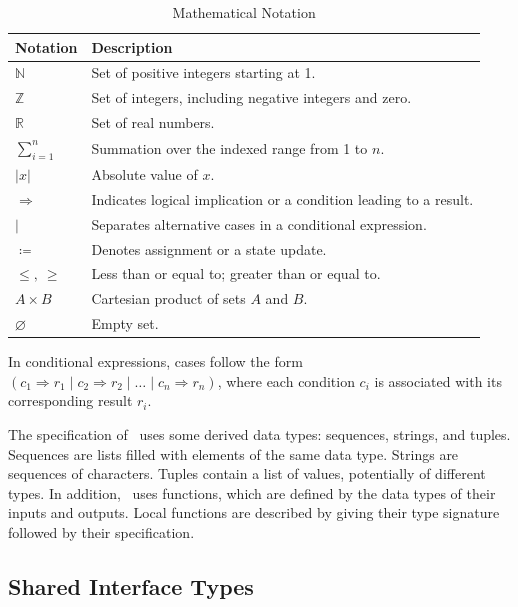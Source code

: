 \documentclass[12pt, titlepage]{article}
\begin{document}
\begin{table}[H]
    \centering
    \caption{Mathematical Notation}
    \label{tab:mathematical-notation}
    \begin{tabularx}{\textwidth}{
        @{}
        >{\centering\arraybackslash}p{}
        >{\raggedright\arraybackslash}X
        @{}
    }
        \toprule
        \textbf{Notation} & \textbf{Description} \\
        \midrule
        $\mathbb{N}$ & Set of positive integers starting at 1. \\
        $\mathbb{Z}$ & Set of integers, including negative integers and zero. \\
        $\mathbb{R}$ & Set of real numbers. \\
        $\sum_{i=1}^{n}$ & Summation over the indexed range from 1 to $n$. \\
        $|x|$ & Absolute value of $x$. \\
        $\Rightarrow$ & Indicates logical implication or a condition leading to a result. \\
        $\mid$ & Separates alternative cases in a conditional expression. \\
        $\coloneqq$ & Denotes assignment or a state update. \\
        $\leq,\ \geq$ & Less than or equal to; greater than or equal to. \\
        $A \times B$ & Cartesian product of sets $A$ and $B$. \\
        $\varnothing$ & Empty set. \\
        \bottomrule
    \end{tabularx}
\end{table}

In conditional expressions, cases follow the form
$(c_1 \Rightarrow r_1 \mid c_2 \Rightarrow r_2 \mid
\ldots \mid c_n \Rightarrow r_n)$, where each condition
$c_i$ is associated with its corresponding result $r_i$.


\noindent
The specification of \progname \ uses some derived data types: sequences, strings, and
tuples. Sequences are lists filled with elements of the same data type. Strings
are sequences of characters. Tuples contain a list of values, potentially of
different types. In addition, \progname \ uses functions, which
are defined by the data types of their inputs and outputs. Local functions are
described by giving their type signature followed by their specification.

\subsection{Shared Interface Types} \label{sec:interface-types}
\end{document}
